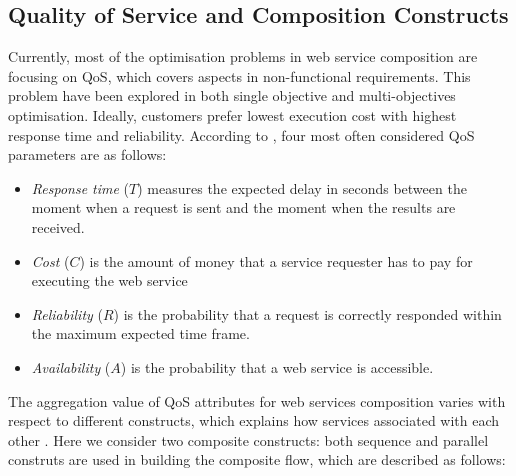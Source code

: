 \documentclass{llncs}
\begin{document}
\subsection{Quality of Service and Composition Constructs}\label{Quality of Service and Composition Constructs}
Currently, most of the optimisation problems \cite{feng2013dynamic,huang2009effective,ma2015hybrid,da2014graph} in web service composition are focusing on QoS, which covers aspects in non-functional requirements. This problem have been explored in both single objective and multi-objectives optimisation. Ideally, customers prefer lowest execution cost with highest response time and reliability. According to \cite{zeng2003quality}, four most often considered QoS parameters are as follows:
\begin{itemize}
\item \textit{Response time} ($T$) measures the expected delay in seconds between the moment when a request is sent and the moment when the results are received.
\item \textit{Cost} ($C$) is the amount of money that a service requester has to pay for executing the web service
\item \textit{Reliability} ($R$) is the probability that a request is correctly responded within the maximum expected time frame.
\item \textit{Availability} ($A$) is the probability that a web service is accessible.
\end{itemize}
The aggregation value of QoS attributes for web services composition varies with respect to different constructs, which explains how services associated with each other \cite{zeng2003quality}. Here we consider two composite constructs: both sequence and parallel construts are used in building the composite flow, which are described as follows:
\end{document}
